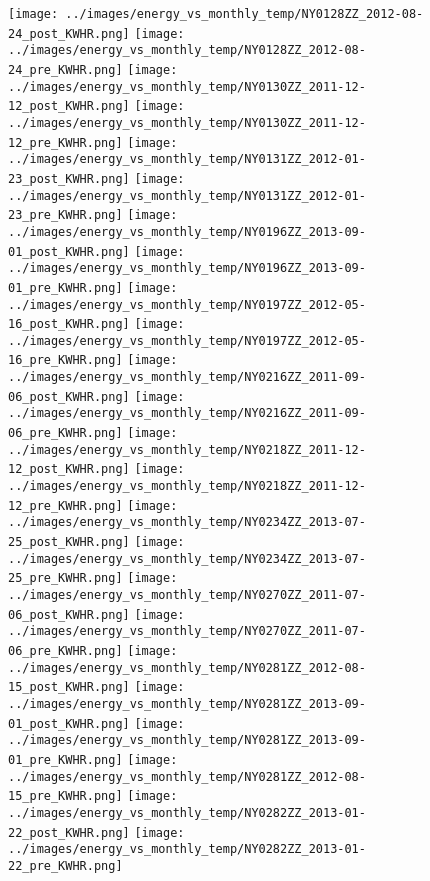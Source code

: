 \clearpage
\begin{figure}
\centering
\texttt{[image: ../images/energy\_vs\_monthly\_temp/NY0128ZZ\_2012-08-24\_post\_KWHR.png]}
\texttt{[image: ../images/energy\_vs\_monthly\_temp/NY0128ZZ\_2012-08-24\_pre\_KWHR.png]}
\texttt{[image: ../images/energy\_vs\_monthly\_temp/NY0130ZZ\_2011-12-12\_post\_KWHR.png]}
\texttt{[image: ../images/energy\_vs\_monthly\_temp/NY0130ZZ\_2011-12-12\_pre\_KWHR.png]}
\texttt{[image: ../images/energy\_vs\_monthly\_temp/NY0131ZZ\_2012-01-23\_post\_KWHR.png]}
\texttt{[image: ../images/energy\_vs\_monthly\_temp/NY0131ZZ\_2012-01-23\_pre\_KWHR.png]}
\texttt{[image: ../images/energy\_vs\_monthly\_temp/NY0196ZZ\_2013-09-01\_post\_KWHR.png]}
\texttt{[image: ../images/energy\_vs\_monthly\_temp/NY0196ZZ\_2013-09-01\_pre\_KWHR.png]}
\texttt{[image: ../images/energy\_vs\_monthly\_temp/NY0197ZZ\_2012-05-16\_post\_KWHR.png]}
\texttt{[image: ../images/energy\_vs\_monthly\_temp/NY0197ZZ\_2012-05-16\_pre\_KWHR.png]}
\texttt{[image: ../images/energy\_vs\_monthly\_temp/NY0216ZZ\_2011-09-06\_post\_KWHR.png]}
\texttt{[image: ../images/energy\_vs\_monthly\_temp/NY0216ZZ\_2011-09-06\_pre\_KWHR.png]}
\texttt{[image: ../images/energy\_vs\_monthly\_temp/NY0218ZZ\_2011-12-12\_post\_KWHR.png]}
\texttt{[image: ../images/energy\_vs\_monthly\_temp/NY0218ZZ\_2011-12-12\_pre\_KWHR.png]}
\texttt{[image: ../images/energy\_vs\_monthly\_temp/NY0234ZZ\_2013-07-25\_post\_KWHR.png]}
\texttt{[image: ../images/energy\_vs\_monthly\_temp/NY0234ZZ\_2013-07-25\_pre\_KWHR.png]}
\texttt{[image: ../images/energy\_vs\_monthly\_temp/NY0270ZZ\_2011-07-06\_post\_KWHR.png]}
\texttt{[image: ../images/energy\_vs\_monthly\_temp/NY0270ZZ\_2011-07-06\_pre\_KWHR.png]}
\texttt{[image: ../images/energy\_vs\_monthly\_temp/NY0281ZZ\_2012-08-15\_post\_KWHR.png]}
\texttt{[image: ../images/energy\_vs\_monthly\_temp/NY0281ZZ\_2013-09-01\_post\_KWHR.png]}
\texttt{[image: ../images/energy\_vs\_monthly\_temp/NY0281ZZ\_2013-09-01\_pre\_KWHR.png]}
\texttt{[image: ../images/energy\_vs\_monthly\_temp/NY0281ZZ\_2012-08-15\_pre\_KWHR.png]}
\texttt{[image: ../images/energy\_vs\_monthly\_temp/NY0282ZZ\_2013-01-22\_post\_KWHR.png]}
\texttt{[image: ../images/energy\_vs\_monthly\_temp/NY0282ZZ\_2013-01-22\_pre\_KWHR.png]}
\end{figure}
